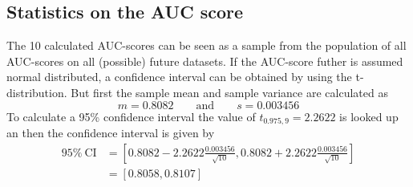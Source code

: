 \subsection{Statistics on the AUC score}
The 10 calculated AUC-scores can be seen as a sample from the population of all AUC-scores on all (possible) future datasets. If the AUC-score futher is assumed normal distributed, a confidence interval can be obtained by using the t-distribution. But first the sample mean and sample variance are calculated as
\[
    m = 0.8082 \quad\quad\text{and}\quad\quad s = 0.003456
\]
To calculate a 95\% confidence interval the value of $t_{0.975,9}=2.2622$ is looked up an then the confidence interval is given by
\begin{align*}
    95\%\:\text{CI} &= [0.8082-2.2622\frac{0.003456}{\sqrt{10}}, 0.8082+2.2622\frac{0.003456}{\sqrt{10}}]\\
    &= [0.8058, 0.8107]
\end{align*}
